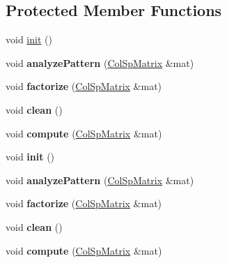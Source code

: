 \subsection*{Protected Member Functions}
\begin{DoxyCompactItemize}
\item 
void \hyperlink{class_eigen_1_1_pastix_base_ac6202714edd1943646e34f16ad384336}{init} ()
\item 
\mbox{\label{class_eigen_1_1_pastix_base_a1c3499de4bd707504925b8d54e57253a}} 
void {\bfseries analyze\+Pattern} (\hyperlink{group___sparse_core___module}{Col\+Sp\+Matrix} \&mat)
\item 
\mbox{\label{class_eigen_1_1_pastix_base_acbaa789672638fd5f621f52c3e951f7c}} 
void {\bfseries factorize} (\hyperlink{group___sparse_core___module}{Col\+Sp\+Matrix} \&mat)
\item 
\mbox{\label{class_eigen_1_1_pastix_base_aaee9ad715b2743747e0e88f53c1d8c47}} 
void {\bfseries clean} ()
\item 
\mbox{\label{class_eigen_1_1_pastix_base_a4173afa8a88aec8f1346372b2de71af9}} 
void {\bfseries compute} (\hyperlink{group___sparse_core___module}{Col\+Sp\+Matrix} \&mat)
\item 
\mbox{\label{class_eigen_1_1_pastix_base_ac6202714edd1943646e34f16ad384336}} 
void {\bfseries init} ()
\item 
\mbox{\label{class_eigen_1_1_pastix_base_a1c3499de4bd707504925b8d54e57253a}} 
void {\bfseries analyze\+Pattern} (\hyperlink{group___sparse_core___module}{Col\+Sp\+Matrix} \&mat)
\item 
\mbox{\label{class_eigen_1_1_pastix_base_acbaa789672638fd5f621f52c3e951f7c}} 
void {\bfseries factorize} (\hyperlink{group___sparse_core___module}{Col\+Sp\+Matrix} \&mat)
\item 
\mbox{\label{class_eigen_1_1_pastix_base_aaee9ad715b2743747e0e88f53c1d8c47}} 
void {\bfseries clean} ()
\item 
\mbox{\label{class_eigen_1_1_pastix_base_a4173afa8a88aec8f1346372b2de71af9}} 
void {\bfseries compute} (\hyperlink{group___sparse_core___module}{Col\+Sp\+Matrix} \&mat)
\end{DoxyCompactItemize}
